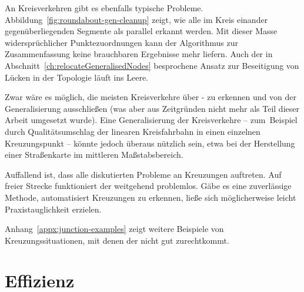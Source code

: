 \documentclass[../main/thesis.tex]{subfiles}
\begin{document}
An Kreisverkehren gibt es ebenfalls typische Probleme.
Abbildung~\ref{fig:roundabout-gen-cleanup} zeigt, wie alle im Kreis einander gegenüberliegenden Segmente als parallel erkannt werden.
Mit dieser Masse widersprüchlicher Punktezuordnungen kann der Algorithmus zur Zusammenfassung keine brauchbaren Ergebnisse mehr liefern.
Auch der in Abschnitt~\ref{ch:relocateGeneralisedNodes} besprochene Ansatz zur Beseitigung von Lücken in der Topologie läuft ins Leere.


Zwar wäre es möglich, die meisten Kreisverkehre über \osm- zu erkennen und von der Generalisierung ausschließen (was aber aus Zeitgründen nicht mehr als Teil dieser Arbeit umgesetzt wurde).
Eine Generalisierung der Kreisverkehre -- zum~Beispiel durch Qualitätsumschlag der linearen Kreisfahrbahn in einen einzelnen Kreuzungspunkt -- könnte jedoch überaus nützlich sein, etwa bei der Herstellung einer Straßenkarte im mittleren Maßstabsbereich.

\newpage
Auffallend ist, dass alle diskutierten Probleme an Kreuzungen auftreten.
Auf freier Strecke funktioniert der  weitgehend problemlos.
Gäbe es eine zuverlässige Methode, automatisiert Kreuzungen zu erkennen, ließe sich möglicherweise leicht Praxistauglichkeit erzielen.

Anhang~\ref{appx:junction-examples} zeigt weitere Beispiele von Kreuzungssituationen, mit denen der  nicht gut zurechtkommt.



\section{Effizienz}
\end{document}
